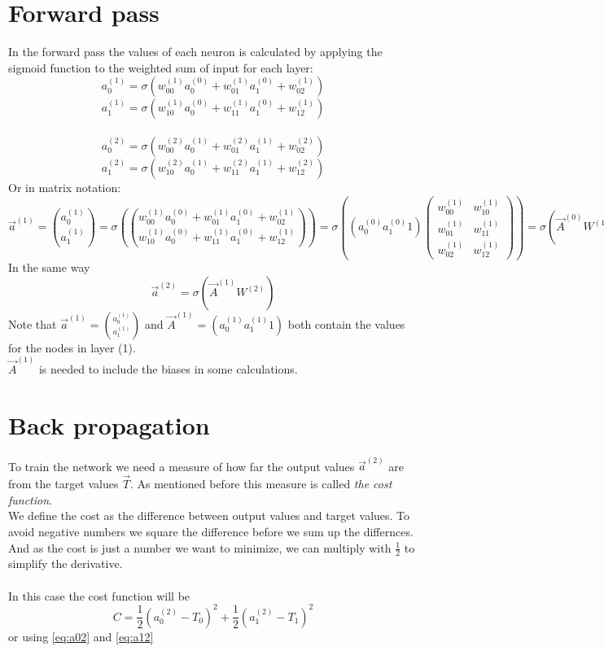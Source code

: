 \documentclass{article}
\begin{document}
\section*{Forward pass}
In the forward pass the values of each neuron is calculated by applying the sigmoid function to the weighted sum of input for each layer:
\\
\begin{equation} \label{eq:a01}
a_0^{(1)} = \sigma(w_{00}^{(1)}a_0^{(0)}+w_{01}^{(1)}a_1^{(0)}+w_{02}^{(1)})
\end{equation}
\begin{equation} \label{eq:a11}
a_1^{(1)} = \sigma(w_{10}^{(1)}a_0^{(0)}+w_{11}^{(1)}a_1^{(0)}+w_{12}^{(1)})
\end{equation}
\\
\begin{equation} \label{eq:a02}
a_0^{(2)} = \sigma(w_{00}^{(2)}a_0^{(1)}+w_{01}^{(2)}a_1^{(1)}+w_{02}^{(2)})
\end{equation}
\begin{equation} \label{eq:a12}
a_1^{(2)} = \sigma(w_{10}^{(2)}a_0^{(1)}+w_{11}^{(2)}a_1^{(1)}+w_{12}^{(2)})
\end{equation}
Or in matrix notation:
\[
\vec a^{(1)} = 
\binom{a_0^{(1)}}{a_1^{(1)}} =
\sigma \left ( \binom{w_{00}^{(1)}a_0^{(0)}+w_{01}^{(1)}a_1^{(0)}+w_{02}^{(1)}}{w_{10}^{(1)}a_0^{(0)}+w_{11}^{(1)}a_1^{(0)}+w_{12}^{(1)}} \right ) 
= \sigma\left((a_0^{(0)} a_1^{(0)} 1)
\begin{pmatrix}
w_{00}^{(1)} & w_{10}^{(1)} \\
w_{01}^{(1)} & w_{11}^{(1)} \\
 w_{02}^{(1)} & w_{12}^{(1)}
\end{pmatrix}\right)
= \sigma(\vec A^{(0)}W^{(1)}) 
\]
In the same way
\[
\vec a^{(2)} = \sigma(\vec A^{(1)}W^{(2)})
\]
Note that $\vec a^{(1)} = \binom{a_0^{(1)}}{a_1^{(1)}}$ and $\vec A^{(1)} = (a_0^{(1)} a_1^{(1)} 1)$ both contain the values for the nodes in layer (1).
\\
$\vec A^{(1)}$ is needed to include the biases in some calculations.
\\
\section*{Back propagation}
To train the network we need a measure of how far the output values $\vec a^{(2)}$ are from the target values $\vec T$. As mentioned before this measure is called \textit{the cost function}.
\\ 
We define the cost as the difference between output values and target values. To avoid negative numbers we square the difference before we sum up the differnces.
\\
And as the cost is just a number we want to minimize, we can multiply with $\frac{1}{2}$ to simplify the derivative.
\\
\\
In this case the cost function will be $$ C = \frac {1}{2}(a_0^{(2)}-T_0)^2 + \frac {1}{2}(a_1^{(2)}-T_1)^2 $$
or using \eqref{eq:a02} and \eqref{eq:a12}
\end{document}
